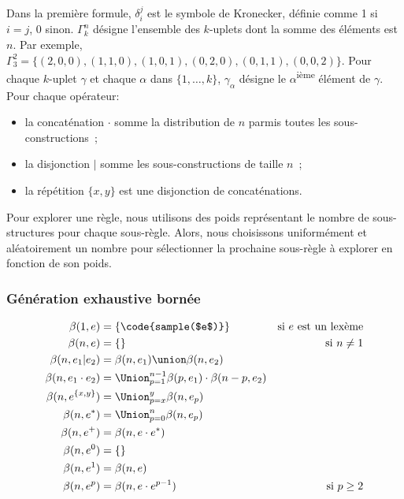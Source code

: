 Dans la première formule, $\delta_i^j$ est le symbole de Kronecker, définie
comme 1 si $i = j$, 0 sinon. $\Gamma_k^n$ désigne l'ensemble des $k$-uplets dont
la somme des éléments est $n$. Par exemple, $\Gamma_3^2 = \{(2, 0, 0), (1, 1,
0), (1, 0, 1), (0, 2, 0), (0, 1, 1), (0, 0, 2)\}$. Pour chaque $k$-uplet
$\gamma$ et chaque $\alpha$ dans $\{1, \dotso, k\}$, $\gamma_\alpha$ désigne le
$\alpha$\textsuperscript{ième} élément de $\gamma$. Pour chaque opérateur:

\begin{itemize}

\item la concaténation $\cdot$ somme la distribution de $n$ parmis toutes les
sous-constructions~;

\item la disjonction $\vert$ somme les sous-constructions de taille $n$~;

\item la répétition $\{x, y\}$ est une disjonction de concaténations.

\end{itemize}

Pour explorer une règle, nous utilisons des poids représentant le nombre de
sous-structures pour chaque sous-règle. Alors, nous choisissons uniformément et
aléatoirement un nombre pour sélectionner la prochaine sous-règle à explorer en
fonction de son poids.

\subsubsection{Génération exhaustive bornée}
\label{subsection:data:bounded_exaustive_generation}

\begin{align*}
%
\beta(1, e) & =
    \{\code{sample($e$)}\}
    &
    \text{si $e$ est un lexème}
    \\
%
\beta(n, e) & =
    \{\}
    &
    \text{si $n \neq 1$}
    \\
%
\beta(n, e_1 \vert e_2) & =
    \beta(n, e_1) \union \beta(n, e_2)
    \\
%
\beta(n, e_1 \cdot e_2) & =
    \Union_{p = 1}^{n - 1}
    \beta(p, e_1) \cdot \beta(n - p, e_2)
    \\
%
\beta(n, e^{\{x, y\}}) & =
    \Union_{p = x}^y \beta(n, e_p)
    \\
%
\beta(n, e^*) & =
    \Union_{p = 0}^n \beta(n, e_p)
    \\
%
\beta(n, e^+) & =
    \beta(n, e \cdot e^*)
    \\
%
\beta(n, e^0) & =
    \{\}
    \\
%
\beta(n, e^1) & =
    \beta(n, e)
    \\
%
\beta(n, e^p) & =
    \beta(n, e \cdot e^{p - 1})
    &
    \text{si $p \geq 2$}
%
\end{align*}

